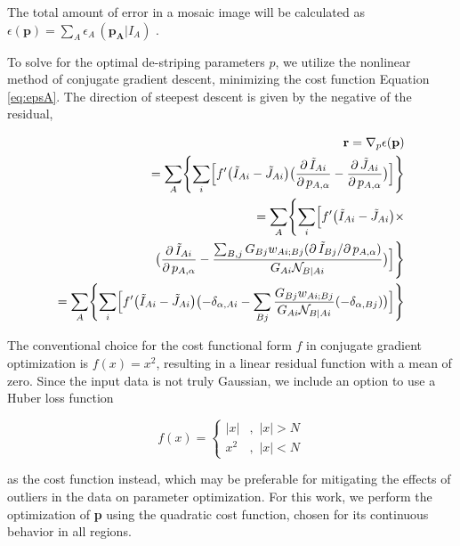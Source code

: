 \documentclass[12pt]{pasj01}
\begin{document}
The total amount of error in a mosaic image will be calculated as $\epsilon(\mathbf{p}) = \sum_{A} \epsilon_A\,(\mathbf{p_A}|I_A)$ . 

To solve for the optimal de-striping parameters $p$, we utilize the nonlinear method of conjugate gradient descent, minimizing the cost function Equation \ref{eq:epsA}. The direction of steepest descent is given by the negative of the residual, 

\begin{equation} \begin{split} \mathbf{r}
=\nabla_p \epsilon(\mathbf{p}) \\ 
 =\sum_{A} \Biggl\{ \sum_{i} \Bigl[ f' \bigl( \tilde{I}_{Ai}-\tilde{J}_{Ai} \bigr) \bigl(\frac{\partial\,\tilde{I}_{Ai}}{\partial\,p_{A,\alpha}} -\frac{\partial\,\tilde{J}_{Ai}}{\partial\,p_{A,\alpha}} \bigr) \Bigr] \Biggr\} \\
 =\sum_{A} \Biggl\{ \sum_{i} \Bigl[ f' \bigl( \tilde{I}_{Ai}-\tilde{J}_{Ai} \bigr) \times \\
 \bigl(\frac{\partial\,\tilde{I}_{Ai}}{\partial\,p_{A,\alpha}} - \frac{\sum_{B,j} G_{Bj} w_{Ai;Bj} ( \partial\,\tilde{I}_{Bj}/\partial\,p_{A,\alpha} )}{G_{Ai} {\cal N}_{B|Ai}} \bigr) \Bigr] \Biggr\} \\
 = \sum_{A} \Biggl\{ \sum_{i} \Bigl[ f' \bigl( \tilde{I}_{Ai}-\tilde{J}_{Ai} \bigr) \bigl(-\delta_{\alpha,Ai}-\sum_{Bj}\frac{G_{Bj}w_{Ai;Bj}}{G_{Ai}{\cal N}_{B|Ai}}(-\delta_{\alpha,Bj})\bigr) \Bigr] \Biggr\}
 \end{split}
 \end{equation}

The conventional choice for the cost functional form $f$ in conjugate gradient optimization is $f(x)=x^2$, resulting in a linear residual function with a mean of zero. Since the input data is not truly Gaussian, we include an option to use a Huber loss function

\begin{equation}
f(x) = \begin{cases}
|x| & ,\,\, |x| > N \\
x^2 & ,\,\, |x| < N
\end{cases}\label{eq:HL}
\end{equation}

as the cost function instead, which may be preferable for mitigating the effects of outliers in the data on parameter optimization. For this work, we perform the optimization of \textbf{p} using the quadratic cost function, chosen for its continuous behavior in all regions. 
\end{document}
